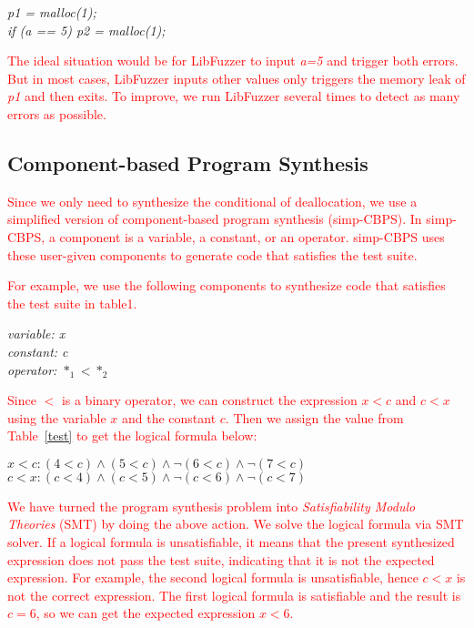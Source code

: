 \documentclass[a4j,dvipdfmx]{article}
\begin{document}
\begin{minipage}{\textwidth}
    \vspace{0.2cm}
    \textsl{\hspace{0.3cm}p1 = malloc(1);\\\hspace{0.3cm}if (a == 5) p2 = malloc(1);\\}
\end{minipage}
\textcolor{red}{
The ideal situation would be for LibFuzzer to input {\it a=5} and trigger both errors. But in most cases,  LibFuzzer inputs other values only triggers the memory leak of {\it p1} and then exits. To improve, we run LibFuzzer several times to detect as many errors as possible.
}
\subsection{Component-based Program Synthesis}
\textcolor{red}{
Since we only need to synthesize the conditional of deallocation, we use a simplified version of component-based program synthesis (simp-CBPS). In simp-CBPS, a component is a variable, a constant, or an operator. simp-CBPS uses these user-given components to generate code that satisfies the test suite. }

\textcolor{red}{
For example, we use the following components to synthesize code that satisfies the test suite in table1.
}

\begin{minipage}{\textwidth}
    \vspace{0.2cm}
    \textsl{\hspace{0.3cm}variable: x\\\hspace{0.3cm}constant: c\\\hspace{0.3cm}operator: $*_1<*_2$\\}
\end{minipage}
\textcolor{red}{
Since $<$ is a binary operator, we can construct the expression $x<c$ and $c<x$ using the variable $x$ and the constant $c$. Then we assign the value from Table~\ref{test} to get the logical formula below:
}

\begin{minipage}{\textwidth}
    \vspace{0.2cm}
    \textsl{\hspace{0.3cm}$x<c: (4<c)\wedge(5<c)\wedge\neg(6<c)\wedge\neg(7<c)$\\\hspace{0.3cm}$c<x: (c<4)\wedge(c<5)\wedge\neg(c<6)\wedge\neg(c<7)$\\}
\end{minipage}
\textcolor{red}{
We have turned the program synthesis problem into {\it Satisfiability Modulo Theories} (SMT) by doing the above action. We solve the logical formula via SMT solver. If a logical formula is unsatisfiable, it means that the present synthesized expression does not pass the test suite, indicating that it is not the expected expression. For example, the second logical formula is unsatisfiable, hence $c<x$ is not the correct expression. The first logical formula is satisfiable and the result is $c=6$, so we can get the expected expression $x<6$.
}
\end{document}

